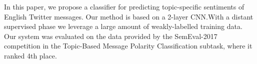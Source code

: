 In this paper, we propose a classifier for predicting topic-specific sentiments of English Twitter messages. Our method is based on a 2-layer CNN.With a distant supervised phase we leverage a large amount of weakly-labelled training data. Our system was evaluated on the data provided by the SemEval-2017 competition in the Topic-Based Message Polarity Classification subtask, where it ranked 4th place.
